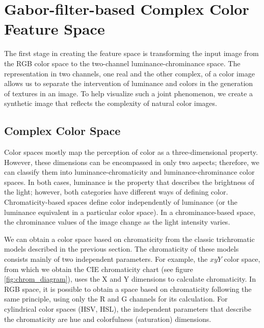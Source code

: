 \documentclass[journal]{IEEEtran}
\begin{document}
\section{Gabor-filter-based Complex Color Feature Space}
The first stage in creating the feature space is transforming the input image from the RGB color space to the two-channel luminance-chrominance space. The representation in two channels, one real and the other complex, of a color image allows us to separate the intervention of luminance and colors in the generation of textures in an image. To help visualize such a joint phenomenon, we create a synthetic image that reflects the complexity of natural color images.


\subsection{Complex Color Space}
Color spaces mostly map the perception of color as a three-dimensional property. However, these dimensions can be encompassed in only two aspects; therefore, we can classify them into luminance-chromaticity and luminance-chrominance color spaces. In both cases, luminance is the property that describes the brightness of the light; however, both categories have different ways of defining color. Chromaticity-based spaces define color independently of luminance (or the luminance equivalent in a particular color space). In a chrominance-based space, the chrominance values of the image change as the light intensity varies.
  
We can obtain a color space based on chromaticity from the classic trichromatic models described in the previous section. The chromaticity of these models consists mainly of two independent parameters. For example, the $xyY$ color space, from which we obtain the CIE chromaticity chart (see figure \ref{fig:chrom_diagram}), uses the X and Y dimensions to calculate chromaticity. In RGB space, it is possible to obtain a space based on chromaticity following the same principle, using only the R and G channels for its calculation. For cylindrical color spaces (HSV, HSL), the independent parameters that describe the chromaticity are hue and colorfulness (saturation) dimensions.
\end{document}
